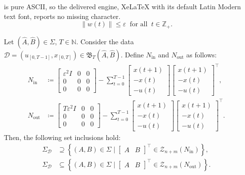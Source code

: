 \documentclass[10pt,a4paper]{amsart}
\newcommand{\norm}[1]{\left\|#1\right\|}
\newcommand{\set}[2]{\left\{#1 \mid #2\right\}}
\begin{document}
is pure ASCII, so the delivered engine, XeLaTeX with its default Latin Modern text font, reports no missing character.
\begin{equation}
\label{eq:ass1}
\norm{w(t)}\leq\varepsilon\ \text{ for all }\ t\in\mathbb{Z}_+.
\end{equation}

\begin{lemma}
\label{lem:exp_qmi}
Let $(\hat{A},\hat{B})\in\Sigma$, $T\in\mathbb{N}$. Consider the data \mbox{$\mathcal{D}=(u_{[0,T-1]},x_{[0,T]})\in\mathfrak{B}_T(\hat{A},\hat{B})$}. Define $N_\text{in}$ and $N_\text{out}$ as follows:
\begin{subequations}
\begin{align}
\label{eq:N_in}
N_\text{in}&\coloneqq\begin{bmatrix}
\varepsilon^2 I & 0 & 0 \\
0 & 0 & 0 \\
0 & 0 & 0
\end{bmatrix}\!-\! \sum_{t=0}^{T-1}\begin{bmatrix}
x(t+1) \\
-x(t) \\
-u(t)
\end{bmatrix}\!\!\!\begin{bmatrix}
x(t+1) \\
-x(t) \\
-u(t)
\end{bmatrix}^\top\!\!, \\
\label{eq:N_out}
N_\text{out}&\coloneqq\begin{bmatrix}
T \varepsilon^2 I & 0 & 0 \\
0 & 0 & 0 \\
0 & 0 & 0
\end{bmatrix}-\sum_{t=0}^{T-1}\begin{bmatrix}
x(t+1) \\
-x(t) \\
-u(t)
\end{bmatrix}\begin{bmatrix}
x(t+1) \\
-x(t) \\
-u(t)
\end{bmatrix}^\top\!\!.
\end{align}
\end{subequations}
Then, the following set inclusions hold:
\begin{subequations}
\begin{align}
\label{eq:lem:exp_qmi-2}
\Sigma_\mathcal{D}&\supseteq\set{(A,B)\in\Sigma}{\begin{bmatrix}
A & B
\end{bmatrix}^\top\in\mathcal{Z}_{n+m}(N_\text{in})},\\
\label{eq:lem:exp_qmi-1}
\Sigma_\mathcal{D}&\subseteq \set{(A,B)\in\Sigma}{\begin{bmatrix}
A & B
\end{bmatrix}^\top\in\mathcal{Z}_{n+m}(N_\text{out})}.
\end{align}
\end{subequations}
\end{lemma}\vspace{0.25 cm}
\end{document}
